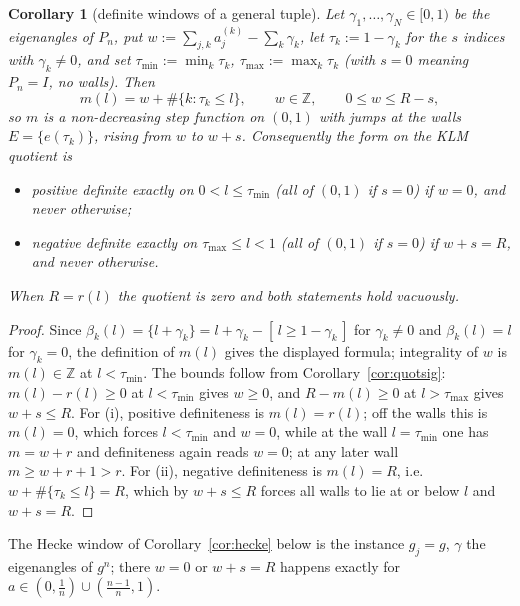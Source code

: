 \documentclass[11pt]{article}
\newtheorem{corollary}[theorem]{Corollary}
\theoremstyle{definition}
\newcommand{\Z}{\mathbb Z}
\newcommand{\frc}[1]{\{#1\}}
\begin{document}
\begin{corollary}[definite windows of a general tuple]\label{cor:windows}
Let $\gamma_1,\dots,\gamma_N\in[0,1)$ be the eigenangles of $P_n$, put
$w:=\sum_{j,k}a_j^{(k)}-\sum_k\gamma_k$, let
$\tau_k:=1-\gamma_k$ for the $s$ indices with $\gamma_k\neq0$, and set
$\tau_{\min}:=\min_k\tau_k$, $\tau_{\max}:=\max_k\tau_k$ (with $s=0$
meaning $P_n=I$, no walls). Then
\[
m(l)=w+\#\{k:\tau_k\le l\},\qquad w\in\Z,\qquad 0\le w\le R-s ,
\]
so $m$ is a non-decreasing step function on $(0,1)$ with jumps at the
walls $E=\{e(\tau_k)\}$, rising from $w$ to $w+s$. Consequently the
form on the KLM quotient is
\begin{itemize}
\item[(i)] positive definite exactly on $0<l\le\tau_{\min}$ (all of
$(0,1)$ if $s=0$) if $w=0$, and never otherwise;
\item[(ii)] negative definite exactly on $\tau_{\max}\le l<1$ (all of
$(0,1)$ if $s=0$) if $w+s=R$, and never otherwise.
\end{itemize}
When $R=r(l)$ the quotient is zero and both statements hold vacuously.
\end{corollary}

\begin{proof}
Since $\beta_k(l)=\frc{l+\gamma_k}=l+\gamma_k-[\,l\ge1-\gamma_k\,]$
for $\gamma_k\neq0$ and $\beta_k(l)=l$ for $\gamma_k=0$, the
definition of $m(l)$ gives the displayed formula; integrality of $w$
is $m(l)\in\Z$ at $l<\tau_{\min}$. The bounds follow from
Corollary~\ref{cor:quotsig}: $m(l)-r(l)\ge0$ at $l<\tau_{\min}$ gives
$w\ge0$, and $R-m(l)\ge0$ at $l>\tau_{\max}$ gives $w+s\le R$. For
(i), positive definiteness is $m(l)=r(l)$; off the walls this is
$m(l)=0$, which forces $l<\tau_{\min}$ and $w=0$, while at the wall
$l=\tau_{\min}$ one has $m=w+r$ and definiteness again reads $w=0$; at
any later wall $m\ge w+r+1>r$. For (ii), negative definiteness is
$m(l)=R$, i.e.\ $w+\#\{\tau_k\le l\}=R$, which by $w+s\le R$ forces
all walls to lie at or below $l$ and $w+s=R$.
\end{proof}

The Hecke window of Corollary~\ref{cor:hecke} below is the instance
$g_j=g$, $\gamma$ the eigenangles of $g^{n}$; there $w=0$ or
$w+s=R$ happens exactly for $a\in(0,\tfrac1n)\cup(\tfrac{n-1}{n},1)$.
\end{document}
